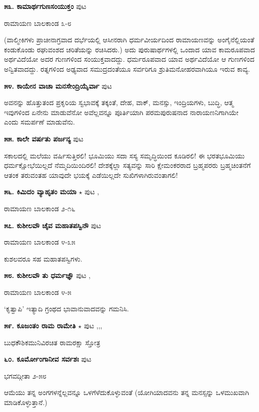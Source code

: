 \medskip
\noindent\textbf{೫೩. ಕಾಮಾರ್ಥಗುಣಸಂಯುಕ್ತಂ} \hfill ಪುಟ \pageref{212}

\hfill ರಾಮಾಯಣ ಬಾಲಕಾಂಡ ೩-೮
 
 (ವಾಲ್ಮೀಕಿಗಳು ಪ್ರಾಚೀನಾಗ್ರವಾದ ದರ್ಭೆಯಲ್ಲಿ ಆಸೀನರಾಗಿ ಧರ್ಮವೀರ್ಯದಿಂದ ರಾಮಾಯಣವನ್ನು ಅಂಗೈನೆಲ್ಲಿಯಂತೆ ಕಂಡುಕೊಂಡು ರಘುವಂಶದ ಚರಿತೆಯನ್ನು ರಚಿಸಿದರು.) ಅದು ಪುರುಷಾರ್ಥಗಳಲ್ಲಿ ಒಂದಾದ ಯಾವ ಕಾಮರೂಪವಾದ ಅರ್ಥವಿದೆಯೋ ಅದರ ಗುಣಗಳಿಂದ ಸಂಯುಕ್ತವಾದದ್ದು. ಧರ್ಮರೂಪವಾದ ಯಾವ ಅರ್ಥವಿದೆಯೋ ಆ ಗುಣಗಳಿಂದ ಅನ್ವಿತವಾದದ್ದು. ರತ್ನಗಳಿಂದ ಅಢ್ಯವಾದ ಸಮುದ್ರದಂತೆಯೂ ಸರ್ವರಿಗೂ ಶ್ರುತಿಮನೋಹರವಾಗಿಯೂ ಇರುವ ಕಾವ್ಯ.
 
\medskip
\noindent\textbf{೫೪. ಕಾಯೇನ ವಾಚಾ ಮನಸೇಂದ್ರಿಯೈರ್ವಾ} \hfill ಪುಟ \pageref{219}

ಅವನನ್ನು ಹೊತ್ತುತಂದ ಪ್ರಕೃರಿಯ ಸ್ವಭಾವಕ್ಕೆ ತಕ್ಕಂತೆ, ದೇಹ, ವಾಕ್, ಮನಸ್ಸು, ಇಂದ್ರಿಯಗಳು, ಬುದ್ಧಿ, ಆತ್ಮ ಇವುಗಳಿಂದ ಏನೇನು ಮಾಡುವೆನೋ ಅವೆಲ್ಲವನ್ನೂ ಪೂರ್ತಿಯಾಗಿ ಪರಮಪುರುಷನಾದ ನಾರಾಯಣನಿಗಾಗಿಯೇ ಎಂದು ಸಮರ್ಪಣೆ ಮಾಡುವೆನು.

\medskip
\noindent\textbf{೫೫. ಕಾಲೇ ವರ್ಷತು ಪರ್ಜನ್ಯ} \hfill ಪುಟ \pageref{149}

ಸಕಾಲದಲ್ಲಿ ಮಲೆಯು ವರ್ಷಿಸುತ್ತಿರಲಿ! ಭೂಮಿಯು ಸದಾ ಸಸ್ಯ ಸಮೃದ್ಧಿಯಿಂದ ಕೂಡಿರಲಿ! ಈ ಭರತಭೂಮಿಯು ಧರ್ಮಕ್ಷೋಭೆಯಿಲ್ಲದೆ ನೆಮ್ಮದಿಯಿಂದಿರಲಿ! ದೇಶಕ್ಕೆಲ್ಲಾ ಸತ್ಯವನ್ನು ಸಾರಿ ಕ್ಷೇಮಂಕರರಾದ ಬ್ರಹ್ಮಪರರು ಬ್ರಹ್ಮಚಿಂತನೆಗೆ ಆತಂಕ ತರುವಂತಹ ಯಾವುದೇ ಭಯಕ್ಕೆ ಎಡೆಯಿಲ್ಲದೇ ಸುಖಿಗಳಾಗಿರುವಂತಾಗಲಿ!

\medskip
\noindent\textbf{೫೬. ಕಿಮಿದಂ ವ್ಯಾಹೃತಂ ಮಯಾ} $\star$ \hfill ಪುಟ \pageref{20},\pageref{157}

\hfill ರಾಮಾಯಣ ಬಾಲಕಾಂಡ ೨-೧೬

\medskip
\noindent\textbf{೫೭. ಕುಶೀಲವೌ ಚೈವ ಮಹಾತಪಸ್ವಿನೌ} \hfill ಪುಟ \pageref{167}

\hfill ರಾಮಾಯಣ ಬಾಲಕಾಂಡ ೪-೩೫

ಕುಶಲವರೂ ಸಹ ಮಹಾತಪಸ್ವಿಗಳು.

\medskip
\noindent\textbf{೫೮. ಕುಶೀಲವೌ ತು ಧರ್ಮಜ್ಞೌ} \hfill ಪುಟ \pageref{238},\pageref{240}

\hfill ರಾಮಾಯಣ ಬಾಲಕಾಂಡ ೪-೫

`ಕೃತ್ವಾಪಿ' ಇತ್ಯಾದಿ ಗ್ರಂಥದ ಭಾವಾನುವಾದವನ್ನು ಗಮನಿಸಿ.

\medskip
\noindent\textbf{೫೯. ಕೂಜಂತಂ ರಾಮ ರಾಮೇತಿ} $\star$ \hfill ಪುಟ \pageref{136},\pageref{148},\pageref{169},\pageref{184}

\hfill ಬುಧಕೌಶಿಕಮುನಿವಿರಚಿತ ರಾಮರಕ್ಷಾ ಸ್ತೋತ್ರ

\medskip
\noindent\textbf{೬೦. ಕೂರ್ಮೋಂಗಾನೀವ ಸರ್ವಶಃ} \hfill ಪುಟ \pageref{222}

\hfill ಭಗವದ್ಗೀತಾ ೨-೫೮

ಆಮೆಯು ತನ್ನ ಅಂಗಗಳನ್ನೆಲ್ಲವನ್ನೂ ಒಳಗೆಳೆದುಕೊಳ್ಳುವಂತೆ (ಯೋಗಿಯಾದವನು ತನ್ನ ಮನಸ್ಸನ್ನು ಒಳಮುಖವಾಗಿ ಮಾಡಿಕೊಳ್ಳುತ್ತಾನೆ.)

